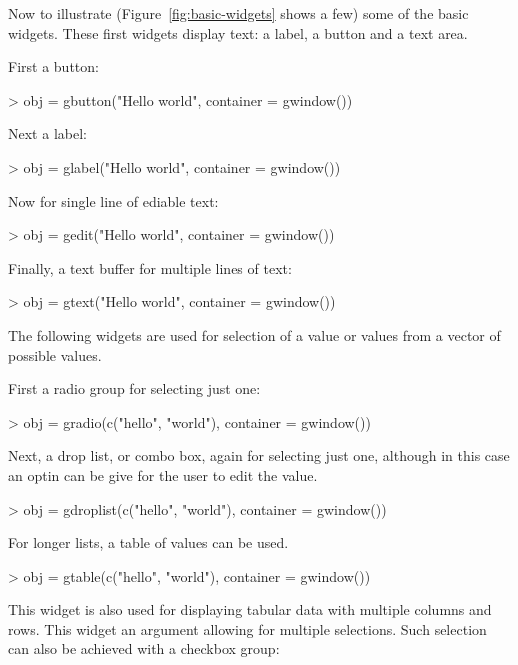 \documentclass[12pt]{article}
\begin{document}
Now to illustrate (Figure~\ref{fig:basic-widgets} shows a few) some of
the basic widgets.
These first widgets display text: a label, a button and a text area.


First a button:
\begin{Schunk}
\begin{Sinput}
> obj = gbutton("Hello world", container = gwindow())
\end{Sinput}
\end{Schunk}

Next a label:
\begin{Schunk}
\begin{Sinput}
> obj = glabel("Hello world", container = gwindow())
\end{Sinput}
\end{Schunk}

Now for single line of ediable text:
\begin{Schunk}
\begin{Sinput}
> obj = gedit("Hello world", container = gwindow())
\end{Sinput}
\end{Schunk}

Finally, a text buffer for multiple lines of text:
\begin{Schunk}
\begin{Sinput}
> obj = gtext("Hello world", container = gwindow())
\end{Sinput}
\end{Schunk}

The following widgets are used for selection of a value or values from
a vector of possible values.

First a radio group for selecting just one:
\begin{Schunk}
\begin{Sinput}
> obj = gradio(c("hello", "world"), container = gwindow())
\end{Sinput}
\end{Schunk}

Next, a drop list, or combo box, again for selecting just one,
although in this case an optin can be give for the user to edit the value.
\begin{Schunk}
\begin{Sinput}
> obj = gdroplist(c("hello", "world"), container = gwindow())
\end{Sinput}
\end{Schunk}

For longer lists, a table of values can be used.
\begin{Schunk}
\begin{Sinput}
> obj = gtable(c("hello", "world"), container = gwindow())
\end{Sinput}
\end{Schunk}
This widget is also used for displaying tabular data with multiple
columns and rows.  This widget an argument allowing for multiple
selections. Such selection can also be achieved with a checkbox group:
\end{document}
